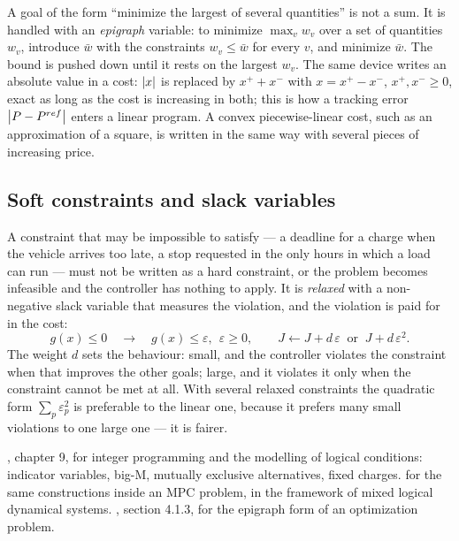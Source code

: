 A goal of the form ``minimize the largest of several quantities'' is not a sum. It is handled
with an \emph{epigraph} variable: to minimize $\max_v w_v$ over a set of quantities $w_v$,
introduce $\bar w$ with the constraints $w_v \le \bar w$ for every $v$, and minimize $\bar w$.
The bound is pushed down until it rests on the largest $w_v$. The same device writes an
absolute value in a cost: $\left\lvert x \right\rvert$ is replaced by $x^{+} + x^{-}$ with $x = x^{+} - x^{-}$,
$x^{+}, x^{-} \ge 0$, exact as long as the cost is increasing in both; this is how a tracking
error $\left\lvert P - P^{ref} \right\rvert$ enters a linear program. A convex piecewise-linear cost, such as an
approximation of a square, is written in the same way with several pieces of increasing price.

\subsection{Soft constraints and slack variables}
\label{sec:soft}

A constraint that may be impossible to satisfy --- a deadline for a charge when the vehicle
arrives too late, a stop requested in the only hours in which a load can run --- must not be
written as a hard constraint, or the problem becomes infeasible and the controller has nothing
to apply. It is \emph{relaxed} with a non-negative slack variable that measures the violation,
and the violation is paid for in the cost:
\begin{equation}
  g(x) \le 0 \quad\longrightarrow\quad g(x) \le \varepsilon,\ \ \varepsilon \ge 0,
  \qquad J \leftarrow J + d\,\varepsilon \ \text{ or } \ J + d\,\varepsilon^2 .
  \label{eq:slack}
\end{equation}
The weight $d$ sets the behaviour: small, and the controller violates the constraint when that
improves the other goals; large, and it violates it only when the constraint cannot be met at
all. With several relaxed constraints the quadratic form $\sum_p \varepsilon_p^2$ is preferable
to the linear one, because it prefers many small violations to one large one --- it is fairer.

\begin{reading}
, chapter 9, for integer programming and the modelling of logical conditions:
indicator variables, big-M, mutually exclusive alternatives, fixed charges.
 for the same constructions inside an MPC problem, in the framework of
mixed logical dynamical systems. , section 4.1.3, for the epigraph form of an
optimization problem.
\end{reading}
